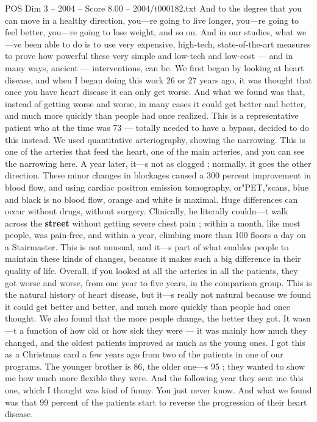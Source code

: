\begin{textsample}{POS Dim 3 – 2004 – Score 8.00 – 2004/t000182.txt}
And to the degree that you can move in a healthy direction, you—re going to live longer, you—re going to feel better, you—re going to lose weight, and so on.
And in our studies, what we—ve been able to do is to use very expensive, high-tech, state-of-the-art measures to prove how powerful these very simple and low-tech and low-cost — and in many ways, ancient — interventions, can be.
We first began by looking at heart disease, and when I began doing this work 26 or 27 years ago, it was thought that once you have heart disease it can only get worse.
And what we found was that, instead of getting worse and worse, in many cases it could get better and better, and much more quickly than people had once realized.
This is a representative patient who at the time was 73 — totally needed to have a bypass, decided to do this instead.
We used quantitative arteriography, showing the narrowing.
This is one of the arteries that feed the heart, one of the main arteries, and you can see the narrowing here.
A year later, it—s not as clogged ; normally, it goes the other direction.
These minor changes in blockages caused a 300 percent improvement in blood flow, and using cardiac positron emission tomography, or"PET,"scans, blue and black is no blood flow, orange and white is maximal.
Huge differences can occur without drugs, without surgery.
Clinically, he literally couldn—t walk across the \textbf{street} without getting severe chest pain ; within a month, like most people, was pain-free, and within a year, climbing more than 100 floors a day on a Stairmaster.
This is not unusual, and it—s part of what enables people to maintain these kinds of changes, because it makes such a big difference in their quality of life.
Overall, if you looked at all the arteries in all the patients, they got worse and worse, from one year to five years, in the comparison group.
This is the natural history of heart disease, but it—s really not natural because we found it could get better and better, and much more quickly than people had once thought.
We also found that the more people change, the better they got.
It wasn—t a function of how old or how sick they were — it was mainly how much they changed, and the oldest patients improved as much as the young ones.
I got this as a Christmas card a few years ago from two of the patients in one of our programs.
The younger brother is 86, the older one—s 95 ; they wanted to show me how much more flexible they were.
And the following year they sent me this one, which I thought was kind of funny.
You just never know.
And what we found was that 99 percent of the patients start to reverse the progression of their heart disease.

\end{textsample}
